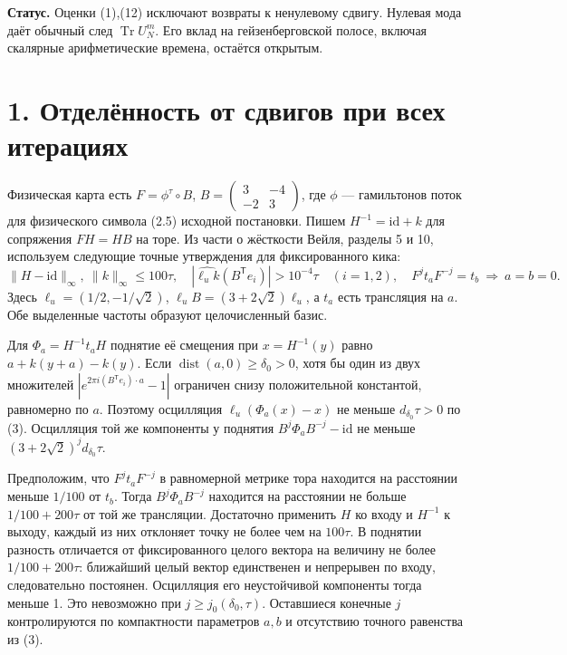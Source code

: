 \documentclass[11pt,a4paper]{article}
\newcommand{\Tr}{\operatorname{Tr}}
\newcommand{\sect}[1]{\section*{\sffamily\color{ink}#1}}
\begin{document}
\textbf{Статус.} Оценки (1),(12) исключают возвраты к ненулевому сдвигу. Нулевая мода даёт обычный след $\Tr U_N^m$. Его вклад на гейзенберговской полосе, включая скалярные арифметические времена, остаётся открытым.
\newpage
\sect{1. Отделённость от сдвигов при всех итерациях}
Физическая карта есть $F=\phi^\tau\circ B$, $B=\left(\begin{smallmatrix}3&-4\\-2&3\end{smallmatrix}\right)$, где $\phi$ --- гамильтонов поток для физического символа (2.5) исходной постановки. Пишем $H^{-1}=\mathrm{id}+k$ для сопряжения $FH=HB$ на торе. Из части о жёсткости Вейля, разделы 5 и 10, используем следующие точные утверждения для фиксированного кика:
\[
 \|H-\mathrm{id}\|_\infty,\ \|k\|_\infty\le100\tau,\quad
 |\widehat{\ell_u k}(B^{\mathsf T}e_i)|>10^{-4}\tau\quad (i=1,2),
 \quad F^j t_a F^{-j}=t_b\ \Longrightarrow\ a=b=0.                   \tag{3}
\]
Здесь $\ell_u=(1/2,-1/\sqrt2)$, $\ell_u B=(3+2\sqrt2)\ell_u$, а $t_a$ есть трансляция на $a$. Обе выделенные частоты образуют целочисленный базис.

Для $\Phi_a=H^{-1}t_aH$ поднятие её смещения при $x=H^{-1}(y)$ равно $a+k(y+a)-k(y)$. Если $\operatorname{dist}(a,0)\ge\delta_0>0$, хотя бы один из двух множителей $|e^{2\pi i(B^{\mathsf T}e_i)\cdot a}-1|$ ограничен снизу положительной константой, равномерно по $a$. Поэтому осцилляция $\ell_u(\Phi_a(x)-x)$ не меньше $d_{\delta_0}\tau>0$ по (3). Осцилляция той же компоненты у поднятия $B^j\Phi_aB^{-j}-\mathrm{id}$ не меньше $(3+2\sqrt2)^j d_{\delta_0}\tau$.

Предположим, что $F^j t_a F^{-j}$ в равномерной метрике тора находится на расстоянии меньше $1/100$ от $t_b$. Тогда $B^j\Phi_a B^{-j}$ находится на расстоянии не больше $1/100+200\tau$ от той же трансляции. Достаточно применить $H$ ко входу и $H^{-1}$ к выходу, каждый из них отклоняет точку не более чем на $100\tau$. В поднятии разность отличается от фиксированного целого вектора на величину не более $1/100+200\tau$: ближайший целый вектор единственен и непрерывен по входу, следовательно постоянен. Осцилляция его неустойчивой компоненты тогда меньше 1. Это невозможно при $j\ge j_0(\delta_0,\tau)$. Оставшиеся конечные $j$ контролируются по компактности параметров $a,b$ и отсутствию точного равенства из (3).
\end{document}
